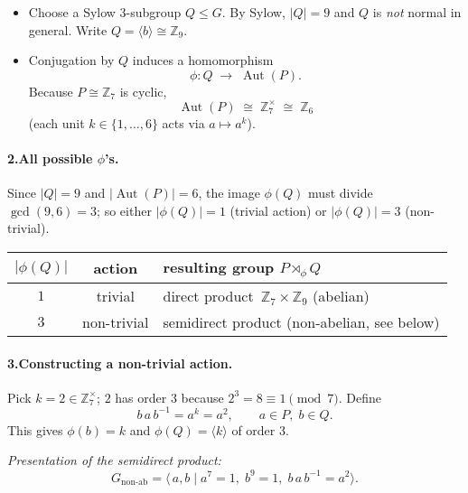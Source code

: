 \documentclass[12pt]{article}
\DeclareMathOperator{\Aut}{Aut}
\theoremstyle{definition} %
\theoremstyle{plain} %
\begin{document}
\begin{itemize}
\item Choose a Sylow $3$-subgroup $Q\le G$.
      By Sylow, $|Q|=9$ and $Q$ is \emph{not} normal in general.  
      Write $Q=\langle b\rangle\cong\mathbb{Z}_{9}$.

\item Conjugation by $Q$ induces a homomorphism  
      \[
            \phi : Q \;\longrightarrow\; \Aut(P).
      \]
      Because $P\cong\mathbb{Z}_{7}$ is cyclic, 
      \[
            \Aut(P)\;\cong\;\mathbb{Z}_{7}^{\times}\;\cong\;\mathbb{Z}_{6}
      \]
      (each unit $k\in\{1,\dots,6\}$ acts via $a\mapsto a^{k}$).
\end{itemize}

\medskip
\paragraph{\textbf{2.\;All possible $\phi$’s.}}

Since $\lvert Q\rvert=9$ and $\lvert\Aut(P)\rvert=6$,  
the image $\phi(Q)$ must divide $\gcd(9,6)=3$; 
so either $|\phi(Q)|=1$ (trivial action) or $|\phi(Q)|=3$ (non-trivial).

\begin{center}
\renewcommand{\arraystretch}{1.15}
\begin{tabular}{|c|c|l|}
\hline
$|\phi(Q)|$ & action & resulting group $P\rtimes_{\phi}Q$ \\\hline
$1$ & trivial & direct product $\,\mathbb{Z}_{7}\times\mathbb{Z}_{9}$ (abelian)\\
$3$ & non-trivial & semidirect product (non-abelian, see below)\\\hline
\end{tabular}
\end{center}

\medskip
\paragraph{\textbf{3.\;Constructing a non-trivial action.}}

Pick $k=2\in\mathbb{Z}_{7}^{\times}$;  
$2$ has order $3$ because $2^{3}=8\equiv1\pmod7$.  
Define
\[
        b\,a\,b^{-1}=a^{k}=a^{2},  
        \qquad  a\in P,\;b\in Q.
\]
This gives $\phi(b)=k$ and $\phi(Q)=\langle k\rangle$ of order $3$.

\smallskip
\emph{Presentation of the semidirect product:}
\[
   G_{\text{non-ab}}=
   \langle\,a,b \mid a^{7}=1,\;b^{9}=1,\;b\,a\,b^{-1}=a^{2}\rangle.
\]
\end{document}
